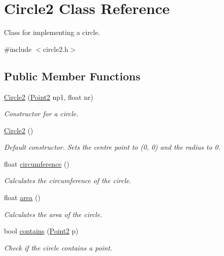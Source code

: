 \hypertarget{class_circle2}{}\section{Circle2 Class Reference}
\label{class_circle2}


Class for implementing a circle.  




{\ttfamily \#include $<$circle2.\+h$>$}

\subsection*{Public Member Functions}
\begin{DoxyCompactItemize}
\item 
\mbox{\hyperlink{class_circle2_aab13bf273807eb9d24724d84a06c0a00}{Circle2}} (\mbox{\hyperlink{class_point2}{Point2}} np1, float nr)
\begin{DoxyCompactList}\small\item\em Constructor for a circle. \end{DoxyCompactList}\item 
\mbox{\hyperlink{class_circle2_ac91654502ff614ede1a5c98e31deaf05}{Circle2}} ()
\begin{DoxyCompactList}\small\item\em Default constructor. Sets the centre point to (0, 0) and the radius to 0. \end{DoxyCompactList}\item 
float \mbox{\hyperlink{class_circle2_accd5087218bd9bb180e9073b416c5a8c}{circumference}} ()
\begin{DoxyCompactList}\small\item\em Calculates the circumference of the circle. \end{DoxyCompactList}\item 
float \mbox{\hyperlink{class_circle2_a18033c62bad2cb9c815734ea0f6a6c7f}{area}} ()
\begin{DoxyCompactList}\small\item\em Calculates the area of the circle. \end{DoxyCompactList}\item 
bool \mbox{\hyperlink{class_circle2_adfff11a508b38dc893d8ed5ba6fbecd7}{contains}} (\mbox{\hyperlink{class_point2}{Point2}} p)
\begin{DoxyCompactList}\small\item\em Check if the circle contains a point. \end{DoxyCompactList}\item 

\end{DoxyCompactItemize}
